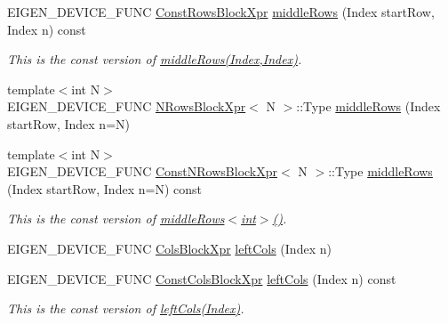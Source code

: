 \begin{DoxyCompactItemize}
E\+I\+G\+E\+N\+\_\+\+D\+E\+V\+I\+C\+E\+\_\+\+F\+U\+NC \mbox{\hyperlink{class_eigen_1_1_block}{Const\+Rows\+Block\+Xpr}} \mbox{\hyperlink{class_eigen_1_1_dense_base_a21b239da40faaef9658b4632d7dd77a7}{middle\+Rows}} (Index start\+Row, Index n) const
\begin{DoxyCompactList}\small\item\em This is the const version of \mbox{\hyperlink{class_eigen_1_1_dense_base_a604b8a3100dd565b536720c2df24e10f}{middle\+Rows(\+Index,\+Index)}}. \end{DoxyCompactList}\item 
{\footnotesize template$<$int N$>$ }\\E\+I\+G\+E\+N\+\_\+\+D\+E\+V\+I\+C\+E\+\_\+\+F\+U\+NC \mbox{\hyperlink{struct_eigen_1_1_dense_base_1_1_n_rows_block_xpr}{N\+Rows\+Block\+Xpr}}$<$ N $>$\+::Type \mbox{\hyperlink{class_eigen_1_1_dense_base_abfa7020bf152e0a39e2a124080c4d59c}{middle\+Rows}} (Index start\+Row, Index n=N)
\item 
\mbox{\label{class_eigen_1_1_dense_base_ad770bd93a55f1b4a561a00dbda6207d7}} 
{\footnotesize template$<$int N$>$ }\\E\+I\+G\+E\+N\+\_\+\+D\+E\+V\+I\+C\+E\+\_\+\+F\+U\+NC \mbox{\hyperlink{struct_eigen_1_1_dense_base_1_1_const_n_rows_block_xpr}{Const\+N\+Rows\+Block\+Xpr}}$<$ N $>$\+::Type \mbox{\hyperlink{class_eigen_1_1_dense_base_ad770bd93a55f1b4a561a00dbda6207d7}{middle\+Rows}} (Index start\+Row, Index n=N) const
\begin{DoxyCompactList}\small\item\em This is the const version of \mbox{\hyperlink{class_eigen_1_1_dense_base_a604b8a3100dd565b536720c2df24e10f}{middle\+Rows$<$int$>$()}}. \end{DoxyCompactList}\item 
E\+I\+G\+E\+N\+\_\+\+D\+E\+V\+I\+C\+E\+\_\+\+F\+U\+NC \mbox{\hyperlink{class_eigen_1_1_block}{Cols\+Block\+Xpr}} \mbox{\hyperlink{class_eigen_1_1_dense_base_a51dba0f45bdf7eef96043b318380054a}{left\+Cols}} (Index n)
\item 
\mbox{\label{class_eigen_1_1_dense_base_a06af178e6158c789e79987a60d4ae3b7}} 
E\+I\+G\+E\+N\+\_\+\+D\+E\+V\+I\+C\+E\+\_\+\+F\+U\+NC \mbox{\hyperlink{class_eigen_1_1_block}{Const\+Cols\+Block\+Xpr}} \mbox{\hyperlink{class_eigen_1_1_dense_base_a06af178e6158c789e79987a60d4ae3b7}{left\+Cols}} (Index n) const
\begin{DoxyCompactList}\small\item\em This is the const version of \mbox{\hyperlink{class_eigen_1_1_dense_base_a51dba0f45bdf7eef96043b318380054a}{left\+Cols(\+Index)}}. \end{DoxyCompactList}\item 

\end{DoxyCompactItemize}
